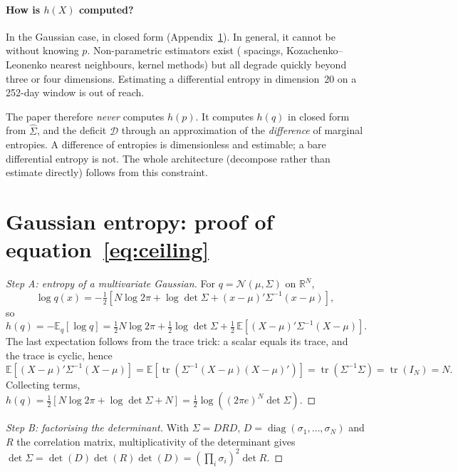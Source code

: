 \documentclass[11pt]{article}
\theoremstyle{definition}
\theoremstyle{remark}
\newcommand{\DD}{\mathcal{D}}
\begin{document}
\paragraph{How is $h(X)$ computed?} In the Gaussian case, in closed form
(Appendix~\ref{app:gauss}). In general, it cannot be without knowing $p$.
Non-parametric estimators exist (\citet{vasicek1976} spacings,
Kozachenko--Leonenko nearest neighbours, kernel methods) but all degrade quickly
beyond three or four dimensions. Estimating a differential entropy in
dimension~20 on a 252-day window is out of reach.

The paper therefore \emph{never} computes $h(p)$. It computes $h(q)$ in closed
form from $\widehat\Sigma$, and the deficit $\DD$ through an approximation of
the \emph{difference} of marginal entropies. A difference of entropies is
dimensionless and estimable; a bare differential entropy is not. The whole
architecture (decompose rather than estimate directly) follows from this
constraint.

\section{Gaussian entropy: proof of equation~\eqref{eq:ceiling}}
\label{app:gauss}

\begin{proof}[Step A: entropy of a multivariate Gaussian]
For $q=\mathcal N(\mu,\Sigma)$ on $\mathbb{R}^N$,
\[
\log q(x) = -\tfrac12\left[N\log 2\pi + \log\det\Sigma + (x-\mu)'\Sigma^{-1}(x-\mu)\right],
\]
so
\[
h(q) = -\mathbb{E}_q[\log q] = \tfrac12 N\log 2\pi + \tfrac12\log\det\Sigma
+ \tfrac12\,\mathbb{E}\!\left[(X-\mu)'\Sigma^{-1}(X-\mu)\right].
\]
The last expectation follows from the trace trick: a scalar equals its trace,
and the trace is cyclic, hence
\[
\mathbb{E}\!\left[(X-\mu)'\Sigma^{-1}(X-\mu)\right]
= \mathbb{E}\!\left[\operatorname{tr}\!\left(\Sigma^{-1}(X-\mu)(X-\mu)'\right)\right]
= \operatorname{tr}(\Sigma^{-1}\Sigma) = \operatorname{tr}(I_N) = N .
\]
Collecting terms, $h(q)=\tfrac12\left[N\log2\pi+\log\det\Sigma+N\right]
=\tfrac12\log\!\left((2\pi e)^N\det\Sigma\right)$.
\end{proof}

\begin{proof}[Step B: factorising the determinant]
With $\Sigma=DRD$, $D=\operatorname{diag}(\sigma_1,\dots,\sigma_N)$ and $R$ the
correlation matrix, multiplicativity of the determinant gives
$\det\Sigma=\det(D)\det(R)\det(D)=\left(\prod_i\sigma_i\right)^2\det R$.
\end{proof}
\end{document}
